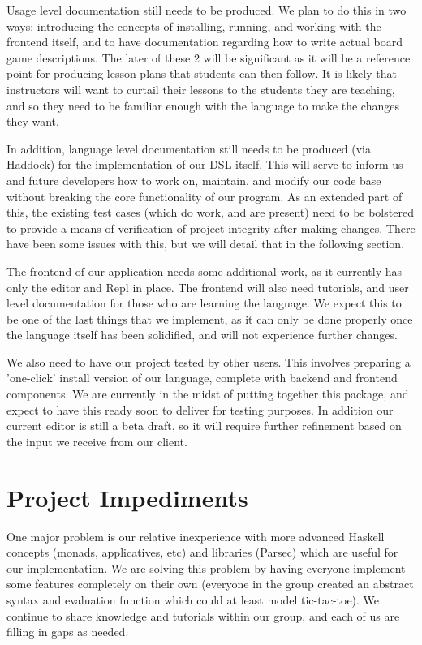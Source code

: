 \documentclass[onecolumn, draftclsnofoot,10pt, compsoc]{IEEEtran}
\begin{document}
\begin{singlespace}
    Usage level documentation still needs to be produced. We plan to do this in two ways: introducing the concepts of installing, running, and working with the frontend itself, and to have documentation regarding how to write actual board game descriptions. The later of these 2 will be significant as it will be a reference point for producing lesson plans that students can then follow. It is likely that instructors will want to curtail their lessons to the students they are teaching, and so they need to be familiar enough with the language to make the changes they want.
    
    In addition, language level documentation still needs to be produced (via Haddock) for the implementation of our DSL itself. This will serve to inform us and future developers how to work on, maintain, and modify our code base without breaking the core functionality of our program. As an extended part of this, the existing test cases (which do work, and are present) need to be bolstered to provide a means of verification of project integrity after making changes. There have been some issues with this, but we will detail that in the following section.
    
    The frontend of our application needs some additional work, as it currently has only the editor and Repl in place. The frontend will also need tutorials, and user level documentation for those who are learning the language. We expect this to be one of the last things that we implement, as it can only be done properly once the language itself has been solidified, and will not experience further changes.
    
    We also need to have our project tested by other users. This involves preparing a 'one-click' install version of our language, complete with backend and frontend components. We are currently in the midst of putting together this package, and expect to have this ready soon to deliver for testing purposes. In addition our current editor is still a beta draft, so it will require further refinement based on the input we receive from our client.
    
\section{Project Impediments}
    One major problem is our relative inexperience with more advanced Haskell concepts (monads, applicatives, etc) and libraries (Parsec) which are useful for our implementation. We are solving this problem by having everyone implement some features completely on their own (everyone in the group created an abstract syntax and evaluation function which could at least model tic-tac-toe). We continue to share knowledge and tutorials within our group, and each of us are filling in gaps as needed. 
    

\end{singlespace}
\end{document}
